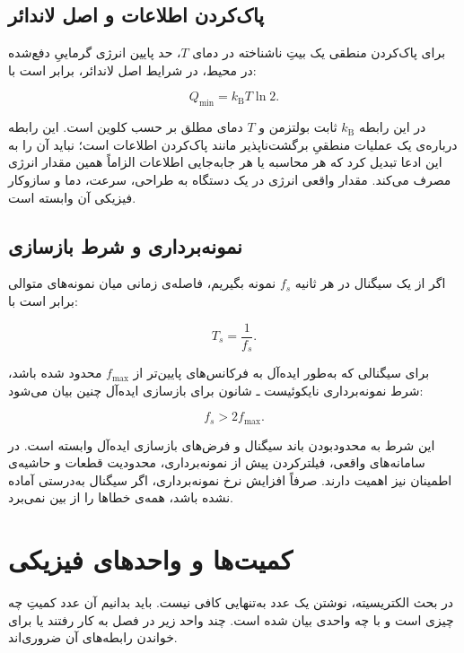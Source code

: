 \section{پاک‌کردن اطلاعات و اصل لاندائر}

برای پاک‌کردن منطقی یک بیتِ ناشناخته در دمای \(T\)، حد پایین انرژی گرماییِ دفع‌شده در محیط، در شرایط اصل لاندائر، برابر است با:

\[
Q_{\min}=k_{\mathrm B}T\ln 2.
\]

در این رابطه \(k_{\mathrm B}\) ثابت بولتزمن و \(T\) دمای مطلق بر حسب کلوین است. این رابطه درباره‌ی یک عملیات منطقیِ برگشت‌ناپذیر مانند پاک‌کردن اطلاعات است؛ نباید آن را به این ادعا تبدیل کرد که هر محاسبه یا هر جابه‌جایی اطلاعات الزاماً همین مقدار انرژی مصرف می‌کند. مقدار واقعی انرژی در یک دستگاه به طراحی، سرعت، دما و سازوکار فیزیکی آن وابسته است.

\section{نمونه‌برداری و شرط بازسازی}

اگر از یک سیگنال در هر ثانیه \(f_s\) نمونه بگیریم، فاصله‌ی زمانی میان نمونه‌های متوالی برابر است با:

\[
T_s=\frac{1}{f_s}.
\]

برای سیگنالی که به‌طور ایده‌آل به فرکانس‌های پایین‌تر از \(f_{\max}\) محدود شده باشد، شرط نمونه‌برداری نایکوئیست ـ شانون برای بازسازی ایده‌آل چنین بیان می‌شود:

\[
f_s>2f_{\max}.
\]

این شرط به محدودبودن باند سیگنال و فرض‌های بازسازی ایده‌آل وابسته است. در سامانه‌های واقعی، فیلترکردن پیش از نمونه‌برداری، محدودیت قطعات و حاشیه‌ی اطمینان نیز اهمیت دارند. صرفاً افزایش نرخ نمونه‌برداری، اگر سیگنال به‌درستی آماده نشده باشد، همه‌ی خطاها را از بین نمی‌برد.

\chapter{کمیت‌ها و واحدهای فیزیکی}
\label{app:physical-quantities}

در بحث الکتریسیته، نوشتن یک عدد به‌تنهایی کافی نیست. باید بدانیم آن عدد کمیتِ چه چیزی است و با چه واحدی بیان شده است. چند واحد زیر در فصل به کار رفتند یا برای خواندن رابطه‌های آن ضروری‌اند.

